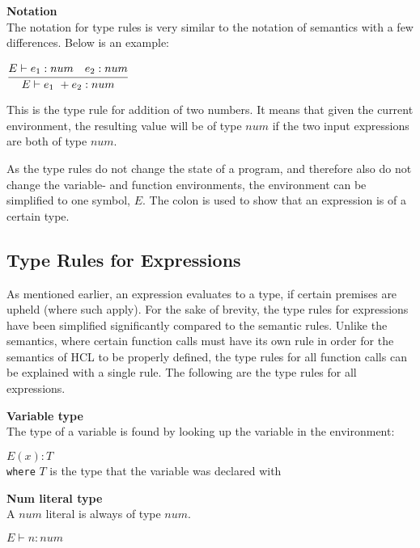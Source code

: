\textbf{Notation}\\
The notation for type rules is very similar to the notation of semantics with a few differences.
Below is an example:\\
\begin{center}
	\begin{math}
	\cfrac
	{E \vdash e_1 : num \quad e_2 : num}
	{E \vdash e_1\ + e_2 : num}
	\end{math}
\end{center}
This is the type rule for addition of two numbers.
It means that given the current environment, the resulting value will be of type $num$ if the two input expressions are both of type $num$.

As the type rules do not change the state of a program, and therefore also do not change the variable- and function environments, the environment can be simplified to one symbol, $E$.
The colon is used to show that an expression is of a certain type.

\subsection{Type Rules for Expressions}
As mentioned earlier, an expression evaluates to a type, if certain premises are upheld (where such apply).
For the sake of brevity, the type rules for expressions have been simplified significantly compared to the semantic rules.
Unlike the semantics, where certain function calls must have its own rule in order for the semantics of HCL to be properly defined, the type rules for all function calls can be explained with a single rule.
The following are the type rules for all expressions.

\textbf{Variable type}\\
The type of a variable is found by looking up the variable in the environment:\\
\begin{center}
	\begin{math}
	E(x) : T
	\end{math}
	\\[1\baselineskip]
	\texttt{where} $T$ is the type that the variable was declared with
\end{center}


\textbf{Num literal type}\\
A $num$ literal is always of type $num$.

\begin{center}
	\begin{math}
		E \vdash n : num
	\end{math}
\end{center}

